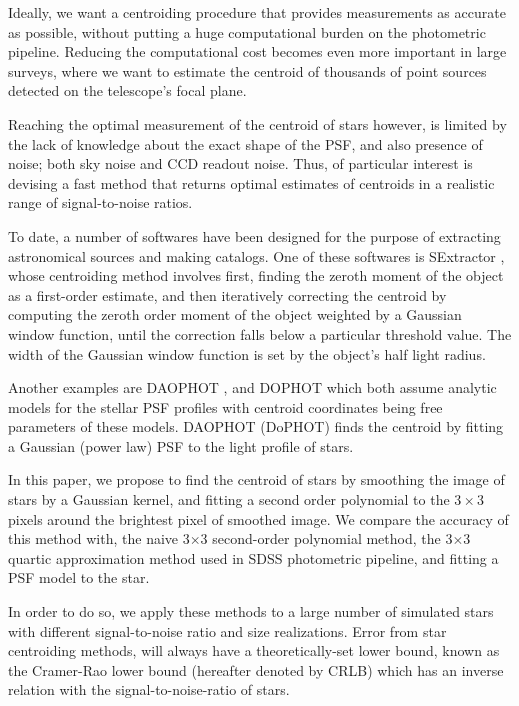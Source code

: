 \documentclass[12pt, preprint]{aastex}
\begin{document}
Ideally, we want a centroiding procedure that provides measurements as accurate as possible,
without putting a huge computational burden on the photometric pipeline.
Reducing the computational cost becomes even more important in large surveys,
where we want to estimate the centroid of thousands of point sources detected
on the telescope's focal plane. 

Reaching the optimal measurement of the centroid of stars however, is limited
by the lack of knowledge about the exact shape of the PSF, and also presence of noise;
both sky noise and CCD readout noise. Thus, of particular interest is devising a fast method that returns
optimal estimates of centroids in a realistic range of signal-to-noise ratios.

To date, a number of softwares have been designed for the purpose of extracting astronomical
sources and making catalogs. One of these softwares is SExtractor \citep{sex},
whose centroiding method involves first, finding the zeroth moment of the object
as a first-order estimate, and then iteratively correcting the centroid by computing
the zeroth order moment of the object weighted by a Gaussian window function,
until the correction falls below a particular threshold value.
The width of the Gaussian window function is set by the object's half light radius.

Another examples are DAOPHOT \citep{daophot}, and DOPHOT \citep{dophot}
which both assume analytic models for the stellar PSF profiles with centroid
coordinates being free parameters of these models.
DAOPHOT (DoPHOT) finds the centroid by fitting a Gaussian (power law) PSF to
the light profile of stars.

In this paper, we propose to find the centroid of stars by smoothing the image
of stars by a Gaussian kernel, and fitting a second order polynomial to
the $3\times$3 pixels around the brightest pixel of smoothed image.
We compare the accuracy of this method with, the naive 3$\times$3 second-order 
polynomial method, the 3$\times$3 quartic approximation
method used in SDSS photometric pipeline, and fitting a PSF model to the 
star.

In order to do so, we apply these methods to a large number of simulated
stars with different signal-to-noise ratio and size realizations. 
Error from star centroiding methods, will always have 
a theoretically-set lower bound, known as the Cramer-Rao lower bound
(hereafter denoted by CRLB) which has an inverse relation with the
signal-to-noise-ratio of stars.
\end{document}
